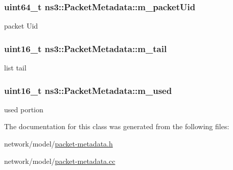 \subsubsection[{\texorpdfstring{m\+\_\+packet\+Uid}{m_packetUid}}]{\setlength{\rightskip}{0pt plus 5cm}uint64\+\_\+t ns3\+::\+Packet\+Metadata\+::m\+\_\+packet\+Uid\hspace{0.3cm}{\ttfamily [private]}}\hypertarget{classns3_1_1PacketMetadata_ad97fbc08482c155bc4c11fdff820be86}{}\label{classns3_1_1PacketMetadata_ad97fbc08482c155bc4c11fdff820be86}


packet Uid 

\subsubsection[{\texorpdfstring{m\+\_\+tail}{m_tail}}]{\setlength{\rightskip}{0pt plus 5cm}uint16\+\_\+t ns3\+::\+Packet\+Metadata\+::m\+\_\+tail\hspace{0.3cm}{\ttfamily [private]}}\hypertarget{classns3_1_1PacketMetadata_ad24a659e236af7b98c475c97c4f60db9}{}\label{classns3_1_1PacketMetadata_ad24a659e236af7b98c475c97c4f60db9}


list tail 

\subsubsection[{\texorpdfstring{m\+\_\+used}{m_used}}]{\setlength{\rightskip}{0pt plus 5cm}uint16\+\_\+t ns3\+::\+Packet\+Metadata\+::m\+\_\+used\hspace{0.3cm}{\ttfamily [private]}}\hypertarget{classns3_1_1PacketMetadata_afeecb22fe6f3368f3c56bda755892df9}{}\label{classns3_1_1PacketMetadata_afeecb22fe6f3368f3c56bda755892df9}


used portion 



The documentation for this class was generated from the following files\+:\begin{DoxyCompactItemize}
\item 
network/model/\hyperlink{packet-metadata_8h}{packet-\/metadata.\+h}\item 
network/model/\hyperlink{packet-metadata_8cc}{packet-\/metadata.\+cc}\end{DoxyCompactItemize}
